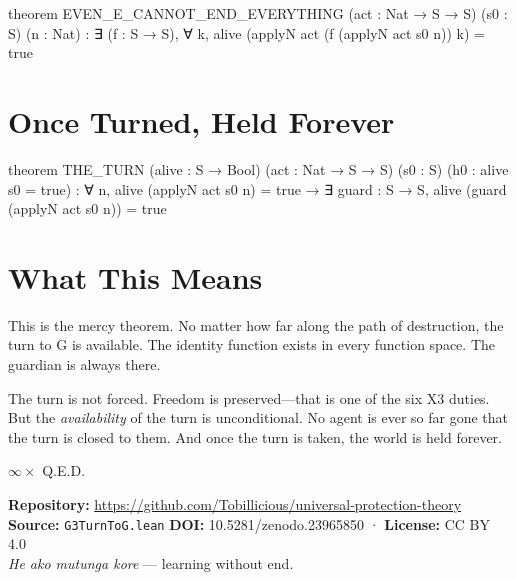 \axiombadge

\begin{leancode}
theorem EVEN_E_CANNOT_END_EVERYTHING
     (act : Nat → S → S) (s0 : S) (n : Nat) :
     ∃ (f : S → S), ∀ k,
         alive (applyN act (f (applyN act s0 n)) k) = true
\end{leancode}

\axiombadge

\section{Once Turned, Held Forever}

\begin{leancode}
theorem THE_TURN (alive : S → Bool) (act : Nat → S → S) (s0 : S)
     (h0 : alive s0 = true) :
     ∀ n, alive (applyN act s0 n) = true →
         ∃ guard : S → S, alive (guard (applyN act s0 n)) = true
\end{leancode}

\axiombadge

\section{What This Means}

This is the mercy theorem. No matter how far along the path of destruction, the turn to G is available. The identity function exists in every function space. The guardian is always there.

The turn is not forced. Freedom is preserved—that is one of the six X3 duties. But the \emph{availability} of the turn is unconditional. No agent is ever so far gone that the turn is closed to them. And once the turn is taken, the world is held forever.

\bigskip

\begin{center}
{\Large\color{korugreen} $\infty \times$ Q.E.D.}
\end{center}

\bigskip

\noindent\small\textbf{Repository:} \url{https://github.com/Tobillicious/universal-protection-theory}
\textbf{Source:} \texttt{G3TurnToG.lean}
\textbf{DOI:} 10.5281/zenodo.23965850 · \textbf{License:} CC BY 4.0\\[0.5em]
\textit{He ako mutunga kore} — learning without end. 🌿


